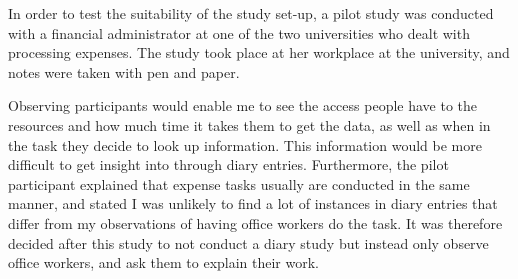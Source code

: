 In order to test the suitability of the study set-up, a pilot study was conducted with a financial administrator at one of the two universities who dealt with processing expenses. The study took place at her workplace at the university, and notes were taken with pen and paper. 

Observing participants would enable me to see the access people have to the resources and how much time it takes them to get the data, as well as when in the task they decide to look up information. This information would be more difficult to get insight into through diary entries. Furthermore, the pilot participant explained that expense tasks usually are conducted in the same manner, and stated I was unlikely to find a lot of instances in diary entries that differ from my observations of having office workers do the task. It was therefore decided after this study to not conduct a diary study but instead only observe office workers, and ask them to explain their work.

